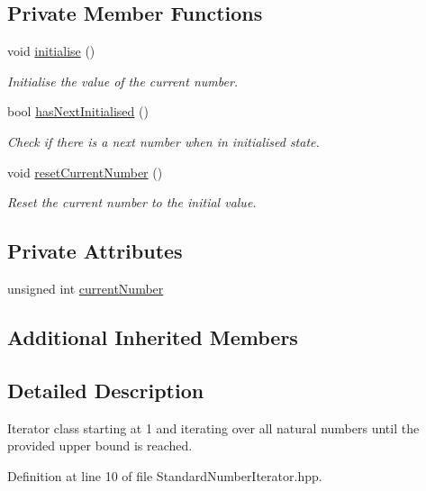 \subsection*{Private Member Functions}
\begin{DoxyCompactItemize}
\item 
void \hyperlink{classmultiscale_1_1StandardNumberIterator_a90d4512fe2d15f9bc5a78396d0092c6a}{initialise} ()
\begin{DoxyCompactList}\small\item\em Initialise the value of the current number. \end{DoxyCompactList}\item 
bool \hyperlink{classmultiscale_1_1StandardNumberIterator_af840d952fae019b7e894a4a238c7d4d8}{has\-Next\-Initialised} ()
\begin{DoxyCompactList}\small\item\em Check if there is a next number when in initialised state. \end{DoxyCompactList}\item 
void \hyperlink{classmultiscale_1_1StandardNumberIterator_a678d43170a27106e1d8c5475b7088d9e}{reset\-Current\-Number} ()
\begin{DoxyCompactList}\small\item\em Reset the current number to the initial value. \end{DoxyCompactList}\end{DoxyCompactItemize}
\subsection*{Private Attributes}
\begin{DoxyCompactItemize}
\item 
unsigned int \hyperlink{classmultiscale_1_1StandardNumberIterator_a1f40c321994d53f705331badd64542be}{current\-Number}
\end{DoxyCompactItemize}
\subsection*{Additional Inherited Members}


\subsection{Detailed Description}
Iterator class starting at 1 and iterating over all natural numbers until the provided upper bound is reached. 

Definition at line 10 of file Standard\-Number\-Iterator.\-hpp.




